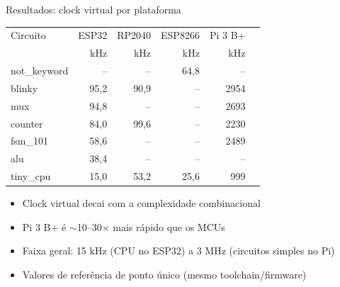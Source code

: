 \documentclass[10pt, aspectratio=169]{beamer}
\begin{document}
\begin{frame}{Resultados: clock virtual por plataforma}
  \centering
  \begin{tabular}{lrrrrr}
    \toprule
    Circuito & ESP32 & RP2040 & ESP8266 & Pi 3 B+ \\
    & \scriptsize kHz & \scriptsize kHz & \scriptsize kHz & \scriptsize kHz \\
    \midrule
    not\_keyword & -- & -- & 64,8 & -- \\
    blinky & 95,2 & 90,9 & -- & 2954 \\
    mux & 94,8 & -- & -- & 2693 \\
    counter & 84,0 & 99,6 & -- & 2230 \\
    fsm\_101 & 58,6 & -- & -- & 2489 \\
    alu & 38,4 & -- & -- & -- \\
    tiny\_cpu & 15,0 & 53,2 & 25,6 & 999 \\
    \bottomrule
  \end{tabular}

  \vspace{0.6em}
  \begin{itemize}
    \item Clock virtual decai com a complexidade combinacional
    \item Pi 3 B+ é $\sim$10--30$\times$ mais rápido que os MCUs
    \item Faixa geral: \alert{15 kHz} (CPU no ESP32) a \alert{3 MHz}
      (circuitos simples no Pi)
    \item Valores de referência de ponto único (mesmo toolchain/firmware)
  \end{itemize}
\end{frame}
\end{document}
